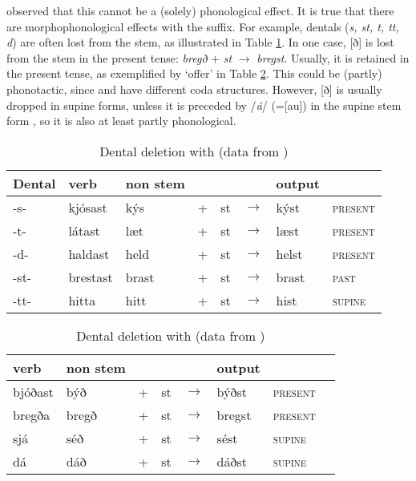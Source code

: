 \documentclass[output=paper,colorlinks,citecolor=brown,
]{langscibook}
\begin{document}
\cite{Anderson:1990sm} observed that this cannot be a (solely) phonological effect. It is true that there are morphophonological effects with the \sti{} suffix. For example, dentals (\textit{s, st, t, tt, d}) are often lost from the stem, as illustrated in Table \ref{woodstem}. In one case, [ð] is lost from the stem in the present tense: \textit{bregð} + \textit{st} $\rightarrow$ \textit{bregst}. Usually, it is retained in the present tense, as exemplified by  `offer' in Table \ref{woodeth}. This could be (partly) phonotactic, since  and  have different coda structures.  However, [ð] is usually dropped in supine forms, unless it is preceded by /\textit{á}/ (=[au]) in the supine stem form \citep[380]{Thomson:1987bn}, so it is also at least partly phonological.


\begin{table}[h!]
\caption{Dental deletion with \sti{} (data from \citealt[380]{Thomson:1987bn})
} \label{woodstem} 


\begin{tabular}{llllllll}
Dental & \sti{} verb & non\sti{} stem & & & & output & \\
\hline\hline
-s- & kjósast & kýs & + & st & $\rightarrow$ & kýst & \textsc{present}\\
-t- & látast & læt & + & st & $\rightarrow$ & læst & \textsc{present}\\
-d- & haldast & held & + & st & $\rightarrow$ & helst & \textsc{present}\\
-st- & brestast & brast & + & st & $\rightarrow$ & brast & \textsc{past}\\
-tt- & hitta & hitt & + & st & $\rightarrow$ & hist & \textsc{supine} \\
\end{tabular}
\end{table}

\begin{table}[h!]
\caption{Dental deletion with \sti{} (data from \citealt[380]{Thomson:1987bn})
} \label{woodeth} 
\begin{tabular}{llllllll}
\sti{} verb & non\sti{} stem & & & & output & \\
\hline \hline
bjóðast & býð & + & st & $\rightarrow$ & býðst & \textsc{present} \\
bregða & bregð & + & st & $\rightarrow$ & bregst & \textsc{present} \\
sjá & séð & + & st & $\rightarrow$ & sést & \textsc{supine} \\
dá & dáð & + & st & $\rightarrow$ & dáðst & \textsc{supine} \\
\end{tabular}
\end{table}
\end{document}
